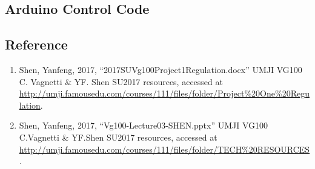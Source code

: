 \subsection{Arduino Control Code}
\singlespacing



\subsection{Reference}
\begin{enumerate}
\item Shen, Yanfeng, 2017, “2017SUVg100Project1Regulation.docx” UMJI VG100 C. Vagnetti \& YF. Shen SU2017 resources, accessed at \url{http://umji.famousedu.com/courses/111/files/folder/Project%20One%20Regulation}.
\item Shen, Yanfeng, 2017, “Vg100-Lecture03-SHEN.pptx” UMJI VG100 C.Vagnetti \& YF.Shen SU2017 resources, accessed at \url{http://umji.famousedu.com/courses/111/files/folder/TECH%20RESOURCES}.
\end{enumerate}